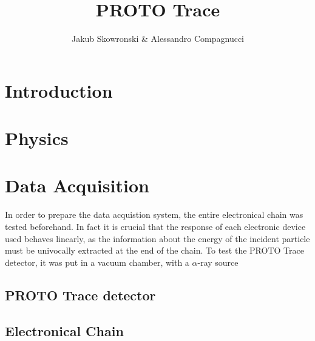 \documentclass[a4paper, 11pt]{article}
\author{Jakub Skowronski & Alessandro Compagnucci}
\title{PROTO Trace}
\begin{document}
\maketitle

\section{Introduction}

\section{Physics}

\section{Data Acquisition}

In order to prepare the data acquistion system, the entire electronical chain
was tested beforehand. In fact it is crucial that the response of each
electronic device used behaves linearly, as the information about the energy
of the incident particle must be univocally extracted at the end of the chain.
To test the PROTO Trace detector, it was put in a vacuum chamber, with a
$\alpha$-ray source

\subsection{PROTO Trace detector}

\subsection{Electronical Chain}
         
\end{document}
